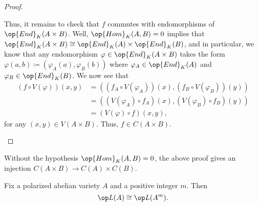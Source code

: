 \documentclass{article}
\begin{document}
\begin{proof}
\begin{itemize}
		Thus, it remains to check that $f$ commutes with endomorphisms of $\op{End}_K(A\times B)$. Well, $\op{Hom}_K(A,B)=0$ implies that $\op{End}_K(A\times B)\cong\op{End}_K(A)\times\op{End}_K(B)$, and in particular, we know that any endomorphism $\varphi\in\op{End}_K(A\times B)$ takes the form $\varphi(a,b)\coloneqq(\varphi_A(a),\varphi_B(b))$ where $\varphi_A\in\op{End}_K(A)$ and $\varphi_B\in\op{End}_K(B)$. We now see that
		\begin{align*}
			(f\circ V(\varphi))(x,y) &= ((f_A\circ V(\varphi_A))(x),(f_B\circ V(\varphi_B))(y)) \\
			&= ((V(\varphi_A)\circ f_A)(x),(V(\varphi_B)\circ f_B)(y)) \\
			&= (V(\varphi)\circ f)(x,y),
		\end{align*}
		for any $(x,y)\in V(A\times B)$. Thus, $f\in C(A\times B)$.
		\qedhere
	\end{itemize}
\end{proof}
\begin{remark}
	Without the hypothesis $\op{Hom}_K(A,B)=0$, the above proof gives an injection $C(A\times B)\to C(A)\times C(B)$.
\end{remark}
\begin{lemma} \label{lem:power-av-lefschetz}
	Fix a polarized abelian variety $A$ and a positive integer $m$. Then
	\[\op L(A)\cong\op L(A^m).\]
\end{lemma}
\end{document}
